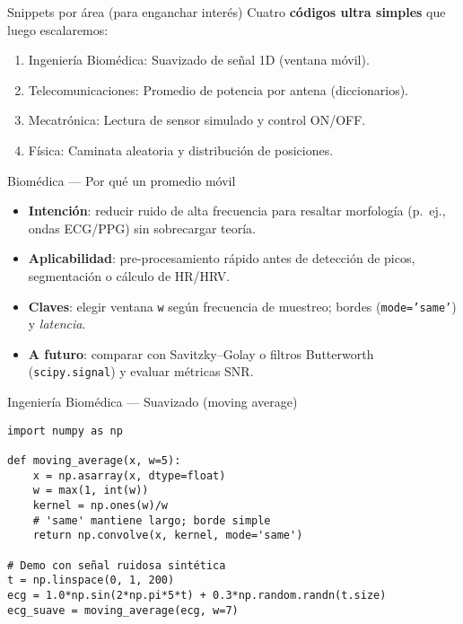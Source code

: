 \documentclass[aspectratio=169,professionalfonts]{beamer}
\begin{document}
\begin{frame}{Snippets por área (para enganchar interés)}
Cuatro \textbf{códigos ultra simples} que luego escalaremos:
\begin{enumerate}
  \item Ingeniería Biomédica: Suavizado de señal 1D (ventana móvil).
  \item Telecomunicaciones: Promedio de potencia por antena (diccionarios).
  \item Mecatrónica: Lectura de sensor simulado y control ON/OFF.
  \item Física: Caminata aleatoria y distribución de posiciones.
\end{enumerate}
\end{frame}

\begin{frame}{Biomédica — Por qué un promedio móvil}
\begin{itemize}
  \item \textbf{Intención}: reducir ruido de alta frecuencia para resaltar morfología (p.~ej., ondas ECG/PPG) sin sobrecargar teoría.
  \item \textbf{Aplicabilidad}: pre-procesamiento rápido antes de detección de picos, segmentación o cálculo de HR/HRV.
  \item \textbf{Claves}: elegir ventana \texttt{w} según frecuencia de muestreo; bordes (\texttt{mode='same'}) y \emph{latencia}.
  \item \textbf{A futuro}: comparar con Savitzky--Golay o filtros Butterworth (\texttt{scipy.signal}) y evaluar métricas SNR.
\end{itemize}
\end{frame}

\begin{frame}[fragile]{Ingeniería Biomédica — Suavizado (moving average)}
\begin{verbatim}
import numpy as np

def moving_average(x, w=5):
    x = np.asarray(x, dtype=float)
    w = max(1, int(w))
    kernel = np.ones(w)/w
    # 'same' mantiene largo; borde simple
    return np.convolve(x, kernel, mode='same')

# Demo con señal ruidosa sintética
t = np.linspace(0, 1, 200)
ecg = 1.0*np.sin(2*np.pi*5*t) + 0.3*np.random.randn(t.size)
ecg_suave = moving_average(ecg, w=7)
\end{verbatim}
\end{frame}
\end{document}
